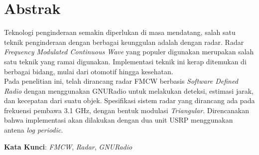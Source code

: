
\chapter*{Abstrak}
\vspace*{0.7cm}

Teknologi penginderaan semakin diperlukan di masa mendatang, salah satu teknik penginderaan dengan berbagai keunggulan adalah dengan radar. Radar \textit{Frequency Modulated Continuous Wave} yang populer digunakan merupakan salah satu teknik yang ramai digunakan. Implementasi teknik ini kerap ditemukan di berbagai bidang, mulai dari otomotif hingga kesehatan.\\

Pada penelitian ini, telah dirancang radar FMCW berbasis \textit{Software Defined Radio} dengan menggunakan GNURadio untuk melakukan deteksi, estimasi jarak, dan kecepatan dari suatu objek. Spesifikasi sistem radar yang dirancang ada pada frekuensi pembawa 3.1 GHz, dengan bentuk modulasi \textit{Triangular}. Direncanakan bahwa implementasi akan dilakukan dengan dua unit USRP menggunakan antena \textit{log periodic}.



\vspace*{0.2cm}

\noindent \textbf{Kata Kunci}: \textit{FMCW}, \textit{Radar}, \textit{GNURadio}\\ 

\newpage